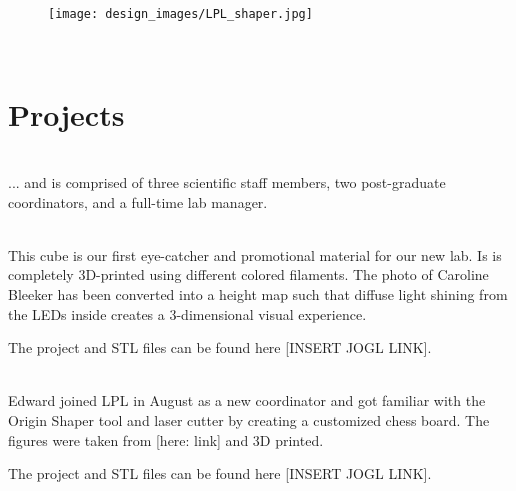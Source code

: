 \documentclass{report}
\newcommand\pagetitle{SectionTitle}
\newcommand{\LPLsection}[1]{%
\begin{figure}%
    \centering%
    \texttt{[image: design\_images/LPL\_shaper.jpg]}%
\end{figure}%
\clearpage%
\,\vspace{\textheight/3}%
\renewcommand\pagetitle{#1}%
\section*{\centering \pagetitle}%
\addcontentsline{toc}{section}{\protect\numberline{}\pagetitle}%
\clearpage%
}
\begin{document}
\LPLsection{Projects}

 \\

... and is comprised of three scientific staff members, two post-graduate coordinators, and a full-time lab manager.

\clearpage
\begin{figure}
    \centering
\end{figure}
\clearpage

 \\

This cube is our first eye-catcher and promotional material for our new lab. Is is completely 3D-printed using different colored filaments. The photo of Caroline Bleeker has been converted into a height map such that diffuse light shining from the LEDs inside creates a 3-dimensional visual experience. 

The project and STL files can be found here [INSERT JOGL LINK].

\clearpage
\begin{figure}
    \centering
\end{figure}
\clearpage

 \\

Edward joined LPL in August as a new coordinator and got familiar with the Origin Shaper tool and laser cutter by creating a customized chess board. The figures were taken from [here: link] and 3D printed. 

The project and STL files can be found here [INSERT JOGL LINK].

\clearpage
\begin{figure}
    \centering
\end{figure}
\clearpage
\end{document}
